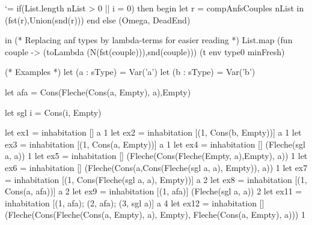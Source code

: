 \documentclass{article}
\let\origlstlisting=\lstlisting
\let\endoriglstlisting=\endlstlisting
\renewenvironment{lstlisting}
{\mathcode`\-=\hyphenmathcode
    \everymath{}\mathsurround=0pt\origlstlisting}
{\endoriglstlisting}
\begin{document}
\begin{lstlisting}
    if(List.length nList > 0 || i = 0) then 
      begin
	let r = compAnfsCouples nList in
	(fst(r),Union(snd(r)))
      end
    else (Omega, DeadEnd)
      
  in (* Replacing anf types by lambda-terms for easier reading *)
  List.map (fun couple -> (toLambda (N(fst(couple))),snd(couple))) (t env type0 minFresh)
  
(* Examples *)
let (a : sType) = Var('a')
let (b : sType) = Var('b')

let afa = Cons(Fleche(Cons(a, Empty), a),Empty)

let sgl i = Cons(i, Empty)


let ex1 = inhabitation [] a 1
let ex2 = inhabitation [(1, Cons(b, Empty))] a 1
let ex3 = inhabitation [(1, Cons(a, Empty))] a 1
let ex4 = inhabitation [] (Fleche(sgl a, a)) 1
let ex5 = inhabitation [] (Fleche(Cons(Fleche(Empty, a),Empty), a)) 1
let ex6 = inhabitation [] (Fleche(Cons(a,Cons(Fleche(sgl a, a), Empty)), a)) 1
let ex7 = inhabitation [(1, Cons(Fleche(sgl a, a), Empty))] a 2
let ex8 = inhabitation [(1, Cons(a, afa))] a 2
let ex9 = inhabitation [(1, afa)] (Fleche(sgl a, a)) 2
let ex11 = inhabitation [(1, afa); (2, afa); (3, sgl a)] a 4
let ex12 = inhabitation [] 
            (Fleche(Cons(Fleche(Cons(a, Empty), a), Empty), Fleche(Cons(a, Empty), a))) 1
\end{lstlisting}
\end{document}
